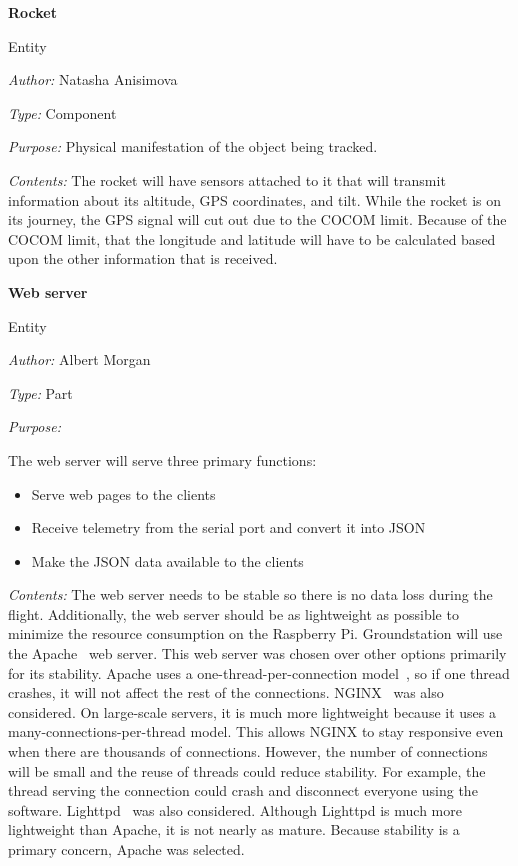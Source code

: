 \documentclass[10pt,draftclsnofoot,onecolumn]{IEEEtran}
\newcommand{\newentity}[5]{

	\noindent\textbf{#2}
	
	\noindent Entity
	
	\noindent\textit{Author:} {#1}
		
	\noindent\textit{Type:} {#3}
	
	\noindent\textit{Purpose:} {#4}

	\noindent\textit{Contents:} {#5}
	\vspace{.5cm}

}
\begin{document}
	\newentity
	{Natasha Anisimova}
	{Rocket}
	{Component}
	{Physical manifestation of the object being tracked.}
	{
		The rocket will have sensors attached to it that will transmit information about its altitude, GPS coordinates, and tilt.
		While the rocket is on its journey, the GPS signal will cut out due to the COCOM limit.
		Because of the COCOM limit, that the longitude
		and latitude will have to be calculated based upon the other information that is received. 
	}
	
	\newentity
	{Albert Morgan}
	{Web server}
	{Part}
	{	The web server will serve three primary functions:
		\begin{itemize}
		\item Serve web pages to the clients
		\item Receive telemetry from the serial port and convert it into JSON
		\item Make the JSON data available to the clients
		\end{itemize}
	}
	{
		The web server needs to be stable so there is no data loss during the flight.
		Additionally, the web server should be as lightweight as possible to minimize the resource consumption on the Raspberry Pi.
		Groundstation will use the Apache~\cite{apache} web server.
		This web server was chosen over other options primarily for its stability.
		Apache uses a one-thread-per-connection model~\cite{nginx-vs-apache-our-view}, so if one thread crashes, it will not affect the rest of the connections.
		NGINX~\cite{nginx} was also considered. On large-scale servers, it is much more lightweight because it uses a many-connections-per-thread
		model.
		This allows NGINX to stay responsive even when there are thousands of connections.
		However, the number of connections will be small and the reuse of threads could reduce stability.
		For example, the thread serving the connection could crash and disconnect everyone using the software.
		Lighttpd~\cite{lighttpd} was also considered. Although Lighttpd is much more lightweight than Apache,
		it is not nearly as mature.
		Because stability is a primary concern, Apache was selected.
	}
\end{document}
